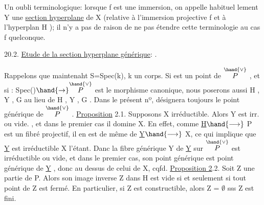 
\margin{$|$}Un oubli terminologique: lorsque f est une immersion, on appelle habituel%
lement Y\hand{$_\xi$} une \uline{section hyperplane} de X (relative à l'immersion projective
f et à l'hyperplan H  ); il n'y a pas de raison de ne pas étendre cette
terminologie au cas f quelconque.

20.2. \uline{Etude de la section hyperplane générique}:  .

Rappelons que maintenaht S=Spec(k), k un corps. Si \hand{$\eta$} est un point
de $\overset{\hand{\vee}}{P}$ ,  et si \hand{$\xi$}: Spec(\hand{$\eta$})$\hand{\to}\overset{\hand{\vee}}{P}$ est le morphisme canonique, nous poserons
aussi H\hand{$_\eta$} , Y\hand{$_\eta$} , G\hand{$_\eta$} au lieu de H\hand{$_\xi$} , Y\hand{$_\xi$} , G\hand{$_\xi$} . Dans le présent nº, \hand{$\eta$}
désignera toujours le point générique de $\overset{\hand{\vee}}{P}$ .
\uline{Proposition} 2.1. Supposons X irréductible. Alors Y\hand{$_\eta$} est irr.  ou vide. ,
et dans le premier cas il domine X. 
En effet, comme \uline{H}$\hand{\longrightarrow}$ P est un fibré projectif, il en est de même de
\uline{Y}$\hand{\longrightarrow}$ X, ce qui implique que \uline{Y} est irréductible X l'étant. Danc la fibre
générique Y   de \uline{Y} sur $\overset{\hand{\vee}}{P}$ est irréductible ou vide, et dans le premier cas,
son point générique est point générique de \uline{Y} , donc au dessus de celui de
X, cqfd.
\uline{Proposition 2}.2. Soit Z une partie de P. Alors son image inverse Z\hand{$_\eta$} dans
H\hand{$_\eta$} est vide si et seulement si tout point de Z est fermé. En particulier,
si Z est constructible, alors Z\hand{$_\eta$} = $\emptyset$ sss Z est fini.

